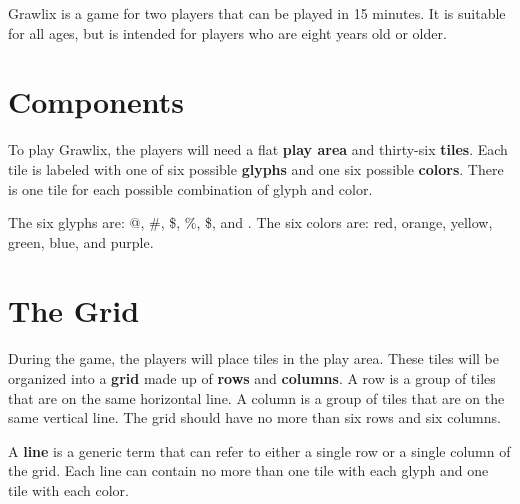 \documentclass[a4paper, 10pt, notumble]{leaflet}
\makeatletter
\newcommand{\smallat}{{\setmainfont{Comic Neue-Bold} \Large @}}
\newcommand{\smallpound}{{\setmainfont{Comic Neue-Bold} \large \#}}
\newcommand{\smalldollar}{{\setmainfont{Comic Neue-Bold} \large \$}}
\newcommand{\smallpercent}{{\setmainfont{Comic Neue-Bold} \large \%}}
\newcommand{\smallampersand}{{\setmainfont{Comic Neue-Bold} \large \$}}
\newcommand{\smallasterisk}{{\setmainfont{Quicksand-Bold} \Huge \raisebox{-0.25ex}{\textasteriskcentered{}}}}
\makeatother
\begin{document}
Grawlix is a game for two players that can be played in 15  minutes. It is suitable for all ages, but is intended for players who are eight years old or older.

\section{Components}
To play Grawlix, the players will need a flat \textbf{play area} and thirty-six \textbf{tiles}. Each tile is labeled with one of six possible \textbf{glyphs} and one six possible \textbf{colors}.  There is one tile for each possible combination of glyph and color.

The six glyphs are: \smallat, \smallpound, \smalldollar, \smallpercent, \smallampersand, and \smallasterisk. The six colors are: red, orange, yellow, green, blue, and purple.

\begin{figure}[h]
\centering
{}

\end{figure}

\newpage

\section{The Grid}
During the game, the players will place tiles in the play area. These tiles will be organized into a \textbf{grid} made up of \textbf{rows} and \textbf{columns}. A row is a group of tiles that are on the same horizontal line.  A column is a group of tiles that are on the same vertical line. The grid should have no more than six rows and six columns.

A \textbf{line} is a generic term that can refer to either a single row or a single column of the grid. Each line can contain no more than one tile with each glyph and one tile with each color.
\end{document}
